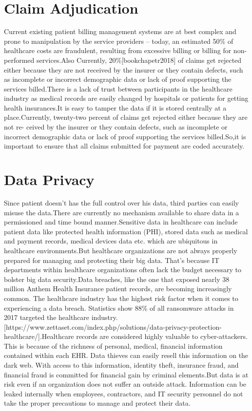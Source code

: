 \documentclass[12pt]{report}
\begin{document}
\section{Claim Adjudication}
Current existing patient billing management systems are at best complex and prone to manipulation by the
service providers – today, an estimated 50\% of healthcare costs are fraudulent, resulting from excessive
billing or billing for non-performed services.Also Currently, 20\%[bookchapetr2018] of claims get rejected either because they are not received by the insurer or they contain defects, such as incomplete or incorrect demographic
data or lack of proof supporting the services billed.There is a lack of trust between participants in the healthcare industry as medical records are easily changed by hospitals or patients for getting health insurances.It is easy to tamper the data if it is stored centrally at a place.Currently, twenty-two percent of claims get rejected either because they are not re-
ceived by the insurer or they contain defects, such as incomplete or incorrect demographic
data or lack of proof supporting the services billed.So,it is important to ensure that all
claims submitted for payment are coded accurately.
\section{Data Privacy}
Since patient doesn't has the full control over his data, third parties can easily misuse the data.There are currently no mechanism available to share data in a permissioned and time bound manner.Sensitive data in healthcare can include patient data like protected health information (PHI), stored data such as medical and payment records, medical devices data etc. which are ubiquitous in healthcare environments.But healthcare organizations are not always properly prepared for managing and protecting their big data. That’s because IT departments within healthcare organizations often lack the budget necessary to bolster big data security.Data breaches, like the one that exposed nearly 38 million Anthem Health Insurance patient records, are becoming increasingly common. The healthcare industry has the highest risk factor when it comes to experiencing a data breach. Statistics show 88\% of all ransomware attacks in 2017 targeted the healthcare industry.[https://www.zettaset.com/index.php/solutions/data-privacy-protection-healthcare/].Healthcare records are considered highly valuable to cyber-attackers. This is because of the richness of personal, medical, financial information contained within each EHR. Data thieves can easily resell this information on the dark web. With access to this information, identity theft, insurance fraud, and financial fraud is committed for financial gain by criminal elements.But data is at risk even if an organization does not suffer an outside attack. Information can be leaked internally when employees, contractors, and IT security personnel do not take the proper precautions to manage and protect their data.
\end{document}
